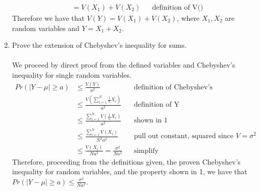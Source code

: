 \documentclass{article}
\begin{document}
\begin{enumerate}
\begin{align}
	     &= V(X_1) + V(X_2) && \text{definition of V()} 
	\end{align}
	Therefore we have that $V(Y) = V(X_1) + V(X_2)$, where $X_1,X_2$ are random variables and $Y = X_1 + X_2$.
	\item Prove the extension of Chebyshev's inequality for sums.
	\\\\ We proceed by direct proof from the defined variables and Chebyshev's inequality for single random variables. 
	\begin{align}
	Pr(|Y - \mu| \geq a) &\leq \frac{V(Y)}{a^2} && \text{definition of Chebyshev's} \\
	&\leq \frac{V(\sum_{i=1}^N \frac{1}{n}X_i)}{a^2} && \text{definition of Y} \\
	&\leq \frac{\sum_{i=1}^N V(\frac{1}{n}X_i)}{a^2} && \text{shown in 1} \\
	&\leq \frac{\sum_{i=1}^N V(X_i)}{N^2a^2} && \text{pull out constant, squared since $V = \sigma^2$} \\
	&\leq \frac{V(X_i)}{Na^2} = \frac{\sigma^2}{Na^2} && \text{simplify} 
	\end{align}
	Therefore, proceeding from the definitions given, the proven Chebyshev's inequality for random variables, and the property shown in 1, we have that $Pr(|Y - \mu| \geq a) \leq \frac{\sigma^2}{Na^2}$.
\end{enumerate}
	
\end{document}

